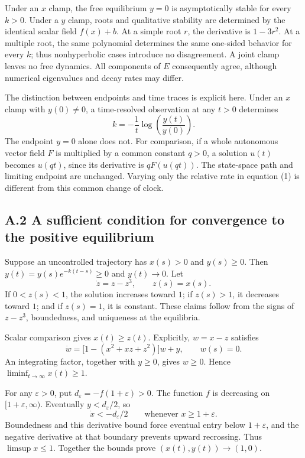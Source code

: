Under an \(x\) clamp, the free equilibrium \(y=0\) is asymptotically stable for every \(k>0\). Under a \(y\) clamp, roots and qualitative stability are determined by the identical scalar field \(f(x)+b\). At a simple root \(r\), the derivative is \(1-3r^2\). At a multiple root, the same polynomial determines the same one-sided behavior for every \(k\); thus nonhyperbolic cases introduce no disagreement. A joint clamp leaves no free dynamics. All components of \(E\) consequently agree, although numerical eigenvalues and decay rates may differ.

The distinction between endpoints and time traces is explicit here. Under an \(x\) clamp with \(y(0)\neq0\), a time-resolved observation at any \(t>0\) determines
\[
k=-\frac{1}{t}\log\!\left(\frac{y(t)}{y(0)}\right).
\]
The endpoint \(y=0\) alone does not. For comparison, if a whole autonomous vector field \(F\) is multiplied by a common constant \(q>0\), a solution \(u(t)\) becomes \(u(qt)\), since its derivative is \(qF(u(qt))\). The state-space path and limiting endpoint are unchanged. Varying only the relative rate in equation (1) is different from this common change of clock.

\subsection*{A.2 A sufficient condition for convergence to the positive equilibrium}\label{app:a.2}

Suppose an uncontrolled trajectory has \(x(s)>0\) and \(y(s)\geq0\). Then \(y(t)=y(s)e^{-k(t-s)}\geq0\) and \(y(t)\to0\). Let
\[
\dot z=z-z^3,\qquad z(s)=x(s).
\]
If \(0<z(s)<1\), the solution increases toward \(1\); if \(z(s)>1\), it decreases toward \(1\); and if \(z(s)=1\), it is constant. These claims follow from the signs of \(z-z^3\), boundedness, and uniqueness at the equilibria.

Scalar comparison gives \(x(t)\geq z(t)\). Explicitly, \(w=x-z\) satisfies
\[
\dot w=\bigl[1-(x^2+xz+z^2)\bigr]w+y,\qquad w(s)=0.
\]
An integrating factor, together with \(y\geq0\), gives \(w\geq0\). Hence \(\liminf_{t\to\infty}x(t)\geq1\).

For any \(\varepsilon>0\), put \(d_\varepsilon=-f(1+\varepsilon)>0\). The function \(f\) is decreasing on \([1+\varepsilon,\infty)\). Eventually \(y<d_\varepsilon/2\), so
\[
\dot x<-d_\varepsilon/2\qquad\text{whenever }x\geq1+\varepsilon.
\]
Boundedness and this derivative bound force eventual entry below \(1+\varepsilon\), and the negative derivative at that boundary prevents upward recrossing. Thus \(\limsup x\leq1\). Together the bounds prove \((x(t),y(t))\to(1,0)\).

